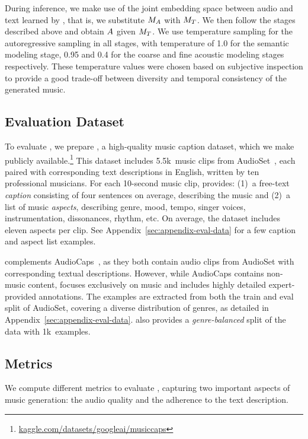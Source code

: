 During inference, we make use of the joint embedding space between audio and text learned by {\mulan}, that is, we substitute $M_A$ with $M_T$. We then follow the stages described above and obtain $A$ given $M_T$.
We use temperature sampling for the autoregressive sampling in all stages, with temperature of 1.0 for the semantic modeling stage, 0.95 and 0.4 for the coarse and fine acoustic modeling stages respectively. These temperature values were chosen based on subjective inspection to provide a good trade-off between diversity and temporal consistency of the generated music.

\subsection{Evaluation Dataset}
To evaluate {\model}, we prepare \dataset, a high-quality music caption dataset, which we make publicly available.\footnote{\href{https://www.kaggle.com/datasets/googleai/musiccaps}{kaggle.com/datasets/googleai/musiccaps}}
This dataset includes 5.5k~music clips from AudioSet~\cite{audioset}, each paired with corresponding text descriptions in English, written by ten professional musicians. For each 10-second music clip, {\datasetshort} provides: (1)~a free-text \emph{caption} consisting of four sentences on average, describing the music and  
(2)~a list of music \emph{aspects}, describing genre, mood, tempo, singer voices, instrumentation, dissonances, rhythm, etc. On average, the dataset includes eleven aspects per clip. See Appendix~\ref{sec:appendix-eval-data} for a few caption and aspect list examples.
    
{\datasetshort} complements AudioCaps~\cite{audiocaps}, as they both contain audio clips from AudioSet with corresponding textual descriptions. However, while AudioCaps contains non-music content, {\datasetshort} focuses exclusively on music and includes highly detailed expert-provided annotations. The examples are extracted from both the train and eval split of AudioSet, covering a diverse distribution of genres, as detailed in Appendix~\ref{sec:appendix-eval-data}. {\datasetshort} also provides a \emph{genre-balanced} split of the data with 1k~examples.

\subsection{Metrics}

We compute different metrics to evaluate {\model}, capturing two important aspects of music generation: the audio quality and the adherence to the text description.

